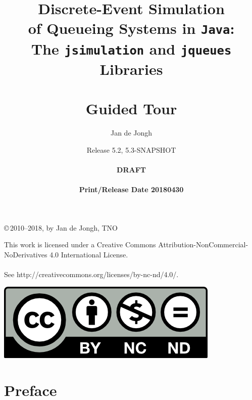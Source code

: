 \documentclass[12pt]{book}
\title{Discrete-Event Simulation\\
       of Queueing Systems in \texttt{Java}:\\
       The \texttt{jsimulation}
       and
       \texttt{jqueues}
       Libraries\\
       \mbox{ } \\
       Guided Tour}
\author{Jan de Jongh}
\date{Release 5.2, 5.3-SNAPSHOT\\
	  \mbox{ } \\
	  {\bf DRAFT}\\
	  \mbox{ }
	  \\{\bf Print/Release Date 20180430}}
\begin{document}
\maketitle

{%
	\vspace*{130mm}
	\thispagestyle{empty}
	\setlength{\parindent}{0pt}
	\copyright\,2010--2018, by Jan de Jongh, TNO
	\vspace*{40mm}
}%

\begin{mdframed}[
  outerlinecolor=black,
  outerlinewidth=2pt,
  linecolor=cccolor,
  middlelinewidth=3pt,
  roundcorner=10pt]
This work is licensed under a Creative Commons
  Attribution-NonCommercial-NoDerivatives
  4.0 International License.\\
  \\
See http://creativecommons.org/licenses/by-nc-nd/4.0/.
  \\
\begin{center}
  \includegraphics[scale=2]{fig/by-nc-nd}
\end{center}
\end{mdframed}



\chapter*{Preface}
\label{chap:preface}

\end{document}
